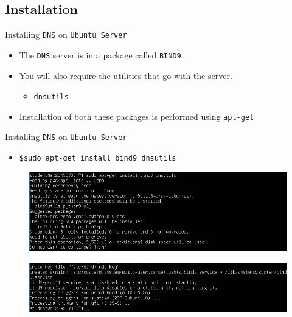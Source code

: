 \documentclass{beamer}
\begin{document}
\subsection{Installation}
\begin{frame}{Installing \texttt{DNS} on \texttt{Ubuntu Server}}
  \begin{itemize}
    \item The \texttt{DNS} server is in a package called \texttt{BIND9}
    \item You will also require the utilities that go with the server.
      \begin{itemize}
        \item \texttt{dnsutils}
      \end{itemize} 
    \item Installation of both these packages is performed using \texttt{apt-get}
  \end{itemize}
\end{frame}

\begin{frame}{Installing \texttt{DNS} on \texttt{Ubuntu Server}}
  \begin{itemize}
    \item \texttt{\$sudo apt-get install bind9 dnsutils}
  \end{itemize}
  \begin{figure}
    \begin{center}
      \includegraphics[width=0.9\linewidth]{bind9-1.png}
    \end{center}
  \end{figure}
  \begin{figure}
    \begin{center}
      \includegraphics[width=0.9\linewidth]{bind9-2.png}
    \end{center}
  \end{figure}
\end{frame}
\end{document}
